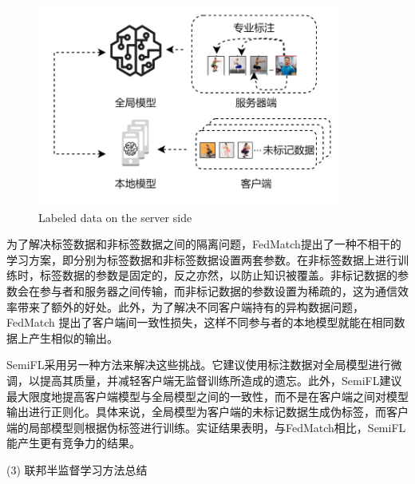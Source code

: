 \begin{figure}[h] %
	\centering %
	\includegraphics[width=10cm]{chapters/imgs/LabelAtServer} %
	{\wuhao Labeled data on the server side} %
	\label{LabelAtServer} %
\end{figure} %

为了解决标签数据和非标签数据之间的隔离问题，FedMatch\citep{jeong2020federated}提出了一种不相干的学习方案，即分别为标签数据和非标签数据设置两套参数。在非标签数据上进行训练时，标签数据的参数是固定的，反之亦然，以防止知识被覆盖。非标记数据的参数会在参与者和服务器之间传输，而非标记数据的参数设置为稀疏的，这为通信效率带来了额外的好处。此外，为了解决不同客户端持有的异构数据问题，FedMatch 提出了客户端间一致性损失，这样不同参与者的本地模型就能在相同数据上产生相似的输出。

SemiFL\citep{diao2022semifl}采用另一种方法来解决这些挑战。它建议使用标注数据对全局模型进行微调，以提高其质量，并减轻客户端无监督训练所造成的遗忘。此外，SemiFL建议最大限度地提高客户端模型与全局模型之间的一致性，而不是在客户端之间对模型输出进行正则化。具体来说，全局模型为客户端的未标记数据生成伪标签，而客户端的局部模型则根据伪标签进行训练。实证结果表明，与FedMatch相比，SemiFL能产生更有竞争力的结果。

(3) 联邦半监督学习方法总结

